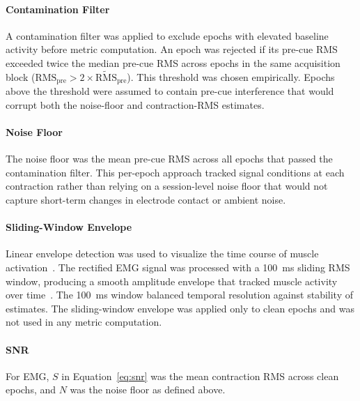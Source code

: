 \paragraph{Contamination Filter} 
A contamination filter was applied to exclude epochs with elevated baseline activity before metric computation. An epoch was rejected if its pre-cue RMS exceeded twice the median pre-cue RMS across epochs in the same acquisition block ($\text{RMS}_\text{pre} > 2 \times \tilde{\text{RMS}}_\text{pre}$). This threshold was chosen empirically. Epochs above the threshold were assumed to contain pre-cue interference that would corrupt both the noise-floor and contraction-RMS estimates.


\paragraph{Noise Floor}
The noise floor was the mean pre-cue RMS across all epochs that passed the contamination filter. This per-epoch approach tracked signal conditions at each contraction rather than relying on a session-level noise floor that would not capture short-term changes in electrode contact or ambient noise.


\paragraph{Sliding-Window Envelope} 
Linear envelope detection was used to visualize the time course of muscle activation~\cite{kamen_essentials_2010}. The rectified EMG signal was processed with a \SI{100}{\milli\second} sliding RMS window, producing a smooth amplitude envelope that tracked muscle activity over time~\cite{konrad_abc_2006}. The \SI{100}{\milli\second} window balanced temporal resolution against stability of estimates. The sliding-window envelope was applied only to clean epochs and was not used in any metric computation.

\paragraph{SNR}
For EMG, $S$ in Equation~\ref{eq:snr} was the mean contraction RMS across clean epochs, and $N$ was the noise floor as defined above.

